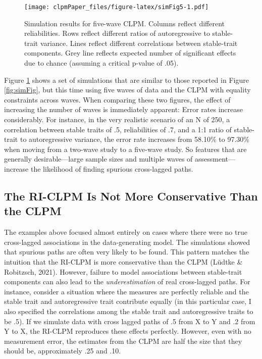\documentclass[
  english,
  man,floatsintext]{apa6}
\begin{document}
\begin{figure}
\centering
\texttt{[image: clpmPaper\_files/figure-latex/simFig5-1.pdf]}
\caption{\label{fig:simFig5}Simulation results for five-wave CLPM. Columns reflect different reliabilities. Rows reflect different ratios of autoregressive to stable-trait variance. Lines reflect different correlations between stable-trait components. Grey line reflects expected number of significant effects due to chance (assuming a critical p-value of .05).}
\end{figure}

Figure \ref{fig:simFig5} shows a set of simulations that are similar to those reported in Figure \ref{fig:simFig}, but this time using five waves of data and the CLPM with equality constraints across waves. When comparing these two figures, the effect of increasing the number of waves is immediately apparent: Error rates increase considerably. For instance, in the very realistic scenario of an N of 250, a correlation between stable traits of .5, reliabilities of .7, and a 1:1 ratio of stable-trait to autoregressive variance, the error rate increases from 58.10\% to 97.30\% when moving from a two-wave study to a five-wave study. So features that are generally desirable---large sample sizes and multiple waves of assessment---increase the likelihood of finding spurious cross-lagged paths.

\hypertarget{the-ri-clpm-is-not-more-conservative-than-the-clpm}{%
\subsection{The RI-CLPM Is Not More Conservative Than the CLPM}\label{the-ri-clpm-is-not-more-conservative-than-the-clpm}}

The examples above focused almost entirely on cases where there were no true cross-lagged associations in the data-generating model. The simulations showed that spurious paths are often very likely to be found. This pattern matches the intuition that the RI-CLPM is more conservative than the CLPM (Lüdtke \& Robitzsch, 2021). However, failure to model associations between stable-trait components can also lead to the \emph{underestimation} of real cross-lagged paths. For instance, consider a situation where the measures are perfectly reliable and the stable trait and autoregressive trait contribute equally (in this particular case, I also specified the correlations among the stable trait and autoregressive traits to be .5). If we simulate data with cross lagged paths of .5 from X to Y and .2 from Y to X, the RI-CLPM reproduces these effects perfectly. However, even with no measurement error, the estimates from the CLPM are half the size that they should be, approximately .25 and .10.
\end{document}
